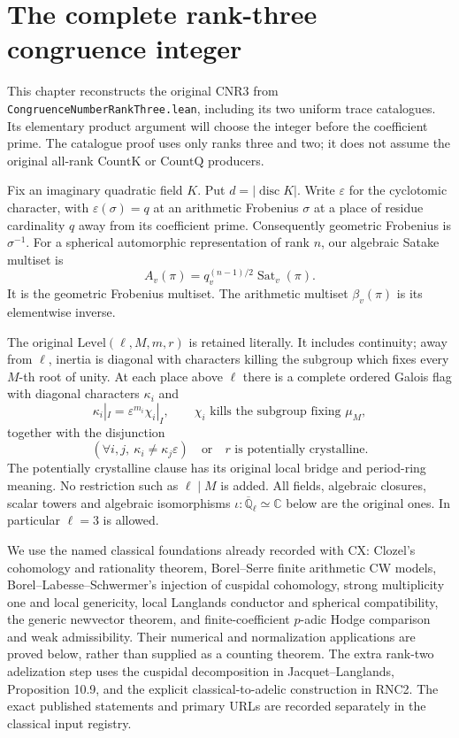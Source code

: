 \section{The complete rank-three congruence integer}
\label{sec:rank-three-congruence-v46}

This chapter reconstructs the original $\mathrm{CNR3}$ from
\texttt{CongruenceNumberRankThree.lean}, including its two uniform
trace catalogues.  Its elementary product argument will choose the
integer before the coefficient prime.  The catalogue proof uses only
ranks three and two; it does not assume the original all-rank
$\mathrm{CountK}$ or $\mathrm{CountQ}$ producers.

Fix an imaginary quadratic field $K$.  Put $d=|\operatorname{disc}K|$.
Write $\varepsilon$ for the cyclotomic character, with
$\varepsilon(\sigma)=q$ at an arithmetic Frobenius $\sigma$ at a
place of residue cardinality $q$ away from its coefficient prime.
Consequently geometric Frobenius is $\sigma^{-1}$.
For a spherical automorphic representation of rank $n$, our
algebraic Satake multiset is
\[
 A_v(\pi)=q_v^{(n-1)/2}\operatorname{Sat}_v(\pi).
                                                               \tag{RNC.1}
\]
It is the geometric Frobenius multiset.  The arithmetic multiset
$\beta_v(\pi)$ is its elementwise inverse.

The original $\mathrm{Level}(\ell,M,m,r)$ is retained literally.
It includes continuity; away from $\ell$, inertia is diagonal with
characters killing the subgroup which fixes every $M$-th root of
unity.  At each place above $\ell$ there is a complete ordered
Galois flag with diagonal characters $\kappa_i$ and
\[
 \kappa_i|_I=\varepsilon^{m_i}\chi_i|_I,
 \qquad \chi_i\text{ kills the subgroup fixing }\mu_M,
                                                               \tag{RNC.2}
\]
together with the disjunction
\[
 (\forall i,j,\ \kappa_i\ne\kappa_j\varepsilon)
       \quad\text{or}\quad r\text{ is potentially crystalline}.
                                                               \tag{RNC.3}
\]
The potentially crystalline clause has its original local bridge
and period-ring meaning.  No restriction such as $\ell\mid M$ is
added.  All fields, algebraic closures, scalar towers and algebraic
isomorphisms $\iota:\overline{\mathbb Q}_\ell\simeq\mathbb C$
below are the original ones.  In particular $\ell=3$ is allowed.

We use the named classical foundations already recorded with CX:
Clozel's cohomology and rationality theorem, Borel--Serre finite
arithmetic CW models, Borel--Labesse--Schwermer's injection of
cuspidal cohomology, strong multiplicity one and local genericity,
local Langlands conductor and spherical compatibility, the generic
newvector theorem, and finite-coefficient $p$-adic Hodge comparison
and weak admissibility.  Their numerical and normalization
applications are proved below, rather than supplied as a counting
theorem.  The extra rank-two adelization step uses the cuspidal
decomposition in Jacquet--Langlands, Proposition 10.9, and the
explicit classical-to-adelic construction in RNC2.  The exact
published statements and primary URLs are recorded separately in
the classical input registry.

